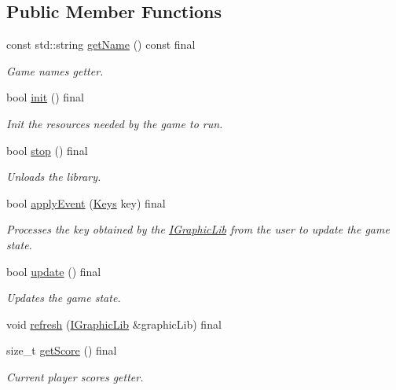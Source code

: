 \subsection*{Public Member Functions}
\begin{DoxyCompactItemize}
\item 
const std\+::string \hyperlink{class_arcade_1_1_nibbler_abbd3cd2246448056bc84b5b893f325d4}{get\+Name} () const final
\begin{DoxyCompactList}\small\item\em Game name\textquotesingle{}s getter. \end{DoxyCompactList}\item 
bool \hyperlink{class_arcade_1_1_nibbler_a244e3c4751d74cab7e4e6ef7b80d0b36}{init} () final
\begin{DoxyCompactList}\small\item\em Init the resources needed by the game to run. \end{DoxyCompactList}\item 
bool \hyperlink{class_arcade_1_1_nibbler_ab88c7e92e23e603b6bd1ccbb6c1ab844}{stop} () final
\begin{DoxyCompactList}\small\item\em Unloads the library. \end{DoxyCompactList}\item 
bool \hyperlink{class_arcade_1_1_nibbler_a979cdf9080be6cb60bf1b4e757029845}{apply\+Event} (\hyperlink{namespace_arcade_a9b501908b20bc993e4f8226db5323c41}{Keys} key) final
\begin{DoxyCompactList}\small\item\em Processes the key obtained by the \hyperlink{class_arcade_1_1_i_graphic_lib}{I\+Graphic\+Lib} from the user to update the game state. \end{DoxyCompactList}\item 
bool \hyperlink{class_arcade_1_1_nibbler_a13199140bc927065b1c59ae2c70e06cf}{update} () final
\begin{DoxyCompactList}\small\item\em Updates the game state. \end{DoxyCompactList}\item 
void \hyperlink{class_arcade_1_1_nibbler_a69a64ec51964772a03cf7d4bb9088b5b}{refresh} (\hyperlink{class_arcade_1_1_i_graphic_lib}{I\+Graphic\+Lib} \&graphic\+Lib) final
\item 
size\+\_\+t \hyperlink{class_arcade_1_1_nibbler_a861f3bebe3b7f5efe1f3a46eb71957bb}{get\+Score} () final
\begin{DoxyCompactList}\small\item\em Current player score\textquotesingle{}s getter. \end{DoxyCompactList}\end{DoxyCompactItemize}


